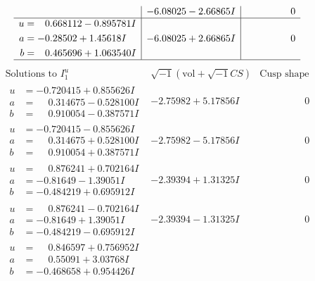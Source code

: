 \documentclass[1p]{elsarticle_modified}
\theoremstyle{definition}
\newcommand{\I}{\sqrt{-1}}
\begin{document}
$$\begin{array}{c|c|c}
 & -6.08025 - 2.66865 I & \phantom{-0.000000 } 0 \\ \hline\begin{aligned}
u &= \phantom{-}0.668112 - 0.895781 I \\
a &= -0.28502 + 1.45618 I \\
b &= \phantom{-}0.465696 + 1.063540 I\end{aligned}
 & -6.08025 + 2.66865 I & \phantom{-0.000000 } 0\\
 \hline 
 \end{array}$$\newpage$$\begin{array}{c|c|c}  
\text{Solutions to }I^u_{1}& \I (\text{vol} + \sqrt{-1}CS) & \text{Cusp shape}\\
 \hline 
\begin{aligned}
u &= -0.720415 + 0.855626 I \\
a &= \phantom{-}0.314675 - 0.528100 I \\
b &= \phantom{-}0.910054 - 0.387571 I\end{aligned}
 & -2.75982 + 5.17856 I & \phantom{-0.000000 } 0 \\ \hline\begin{aligned}
u &= -0.720415 - 0.855626 I \\
a &= \phantom{-}0.314675 + 0.528100 I \\
b &= \phantom{-}0.910054 + 0.387571 I\end{aligned}
 & -2.75982 - 5.17856 I & \phantom{-0.000000 } 0 \\ \hline\begin{aligned}
u &= \phantom{-}0.876241 + 0.702164 I \\
a &= -0.81649 - 1.39051 I \\
b &= -0.484219 + 0.695912 I\end{aligned}
 & -2.39394 + 1.31325 I & \phantom{-0.000000 } 0 \\ \hline\begin{aligned}
u &= \phantom{-}0.876241 - 0.702164 I \\
a &= -0.81649 + 1.39051 I \\
b &= -0.484219 - 0.695912 I\end{aligned}
 & -2.39394 - 1.31325 I & \phantom{-0.000000 } 0 \\ \hline\begin{aligned}
u &= \phantom{-}0.846597 + 0.756952 I \\
a &= \phantom{-}0.55091 + 3.03768 I \\
b &= -0.468658 + 0.954426 I\end{aligned}

\end{array}$$
\end{document}
